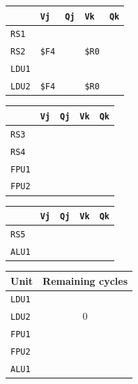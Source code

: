 \begin{enumerate}
    \begin{minipage}{0.45\textwidth}
        \centering
        \begin{tabular}{@{} l | l l l l @{}}
            \toprule
                & \texttt{Vj} & \texttt{Qj} & \texttt{Vk} & \texttt{Qk} \\
            \midrule
            \texttt{RS1} & & & & \\ [.3em]
            \texttt{RS2} & \texttt{\$F4} & & \texttt{\$R0} & \\
            \cmidrule{1-5}
            \texttt{LDU1} & & & & \\ [.3em]
            \texttt{LDU2} & \texttt{\$F4} & & \texttt{\$R0} & \\
            \bottomrule
        \end{tabular}
    \end{minipage}
    \hfill
    \begin{minipage}{0.45\textwidth}
        \centering
        \begin{tabular}{@{} l | l l l l @{}}
            \toprule
            & \texttt{Vj} & \texttt{Qj} & \texttt{Vk} & \texttt{Qk} \\
            \midrule
            \texttt{RS3} & & & & \\ [.3em]
            \texttt{RS4} & & & & \\
            \cmidrule{1-5}
            \texttt{FPU1} & & & & \\ [.3em]
            \texttt{FPU2} & & & & \\
            \bottomrule
        \end{tabular}
    \end{minipage}

    \begin{minipage}{0.45\textwidth}
        \centering
        \begin{tabular}{@{} l | l l l l @{}}
            \toprule
            & \texttt{Vj} & \texttt{Qj} & \texttt{Vk} & \texttt{Qk} \\
            \midrule
            \texttt{RS5} & & & & \\
            \cmidrule{1-5}
            \texttt{ALU1} & & & & \\
            \bottomrule
        \end{tabular}
    \end{minipage}
    \hfill
    \begin{minipage}{0.45\textwidth}
        \centering
        \begin{tabular}{@{} l c @{}}
            \toprule
            Unit            & Remaining cycles \\
            \midrule
            \texttt{LDU1}   & \\ [.3em]
            \texttt{LDU2}   & 0 \\ [.3em]
            \texttt{FPU1}   & \\ [.3em]
            \texttt{FPU2}   & \\ [.3em]
            \texttt{ALU1}   & \\
            \bottomrule
        \end{tabular}
    \end{minipage}
\end{enumerate}
